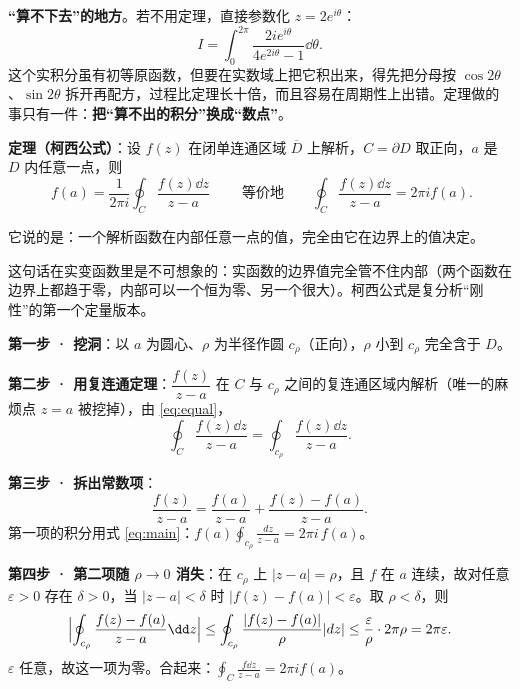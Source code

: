 \textbf{“算不下去”的地方}。若不用定理，直接参数化 $z=2e^{i\theta}$：
\[ I=\int_0^{2\pi}\frac{2ie^{i\theta}}{4e^{2i\theta}-1}\dd\theta . \]
这个实积分虽有初等原函数，但要在实数域上把它积出来，得先把分母按 $\cos2\theta$、$\sin2\theta$ 拆开再配方，过程比定理长十倍，而且容易在周期性上出错。定理做的事只有一件：\textbf{把“算不出的积分”换成“数点”}。


\flowerrule



\textbf{定理（柯西公式）}：设 $f(z)$ 在闭单连通区域 $\overline{D}$ 上解析，$C=\partial D$ 取正向，$a$ 是 $D$ 内任意一点，则
\begin{equation}\label{eq:cauchy}
\boxed{\;f(a)=\frac{1}{2\pi i}\oint_C\frac{f(z)\dd z}{z-a}\;}
\qquad\text{等价地}\qquad
\oint_C\frac{f(z)\dd z}{z-a}=2\pi i f(a).
\end{equation}

它说的是：一个解析函数在内部任意一点的值，完全由它在边界上的值决定。


这句话在实变函数里是不可想象的：实函数的边界值完全管不住内部（两个函数在边界上都趋于零，内部可以一个恒为零、另一个很大）。柯西公式是复分析“刚性”的第一个定量版本。


\textbf{第一步 · 挖洞}：以 $a$ 为圆心、$\rho$ 为半径作圆 $c_\rho$（正向），$\rho$ 小到 $c_\rho$ 完全含于 $D$。

\textbf{第二步 · 用复连通定理}：$\dfrac{f(z)}{z-a}$ 在 $C$ 与 $c_\rho$ 之间的复连通区域内解析（唯一的麻烦点 $z=a$ 被挖掉），由 \eqref{eq:equal}，
\[ \oint_C\frac{f(z)\dd z}{z-a}=\oint_{c_\rho}\frac{f(z)\dd z}{z-a} . \]

\textbf{第三步 · 拆出常数项}：
\[ \frac{f(z)}{z-a}=\frac{f(a)}{z-a}+\frac{f(z)-f(a)}{z-a} . \]
第一项的积分用式 \eqref{eq:main}：$\displaystyle f(a)\oint_{c_\rho}\frac{dz}{z-a}=2\pi i\,f(a)$。

\textbf{第四步 · 第二项随 $\rho\to0$ 消失}：在 $c_\rho$ 上 $|z-a|=\rho$，且 $f$ 在 $a$ 连续，故对任意 $\varepsilon>0$ 存在 $\delta>0$，当 $|z-a|<\delta$ 时 $|f(z)-f(a)|<\varepsilon$。取 $\rho<\delta$，则
\[ \Bigl|\oint_{c_\rho}\frac{f(z)-f(a)}{z-a}\dd z\Bigr|
\le\oint_{c_\rho}\frac{|f(z)-f(a)|}{\rho}|dz|
\le\frac{\varepsilon}{\rho}\cdot2\pi\rho=2\pi\varepsilon . \]
$\varepsilon$ 任意，故这一项为零。合起来：$\displaystyle\oint_C\frac{f\dd z}{z-a}=2\pi i f(a)$。

